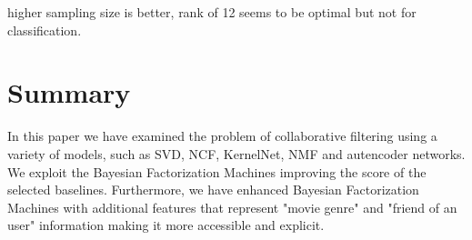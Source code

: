 \documentclass[10pt,conference,compsocconf]{IEEEtran}
\begin{document}
    higher sampling size is better, rank of 12 seems to be optimal but not for classification.


    \section{Summary}

    In this paper we have examined the problem of collaborative filtering using a variety of models, such as SVD, NCF, KernelNet, NMF and autencoder networks. We exploit the Bayesian Factorization Machines improving the score of the selected baselines. Furthermore, we have enhanced Bayesian Factorization Machines with additional features that represent "movie genre" and "friend of an user" information making it more accessible and explicit.



    \balance
    
    
\end{document}
